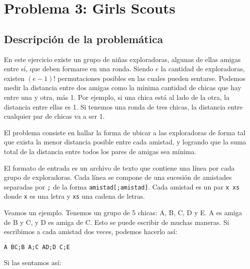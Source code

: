 \section{Problema 3: Girls Scouts}
\subsection{Descripción de la problemática}

En este ejercicio existe un grupo de niñas exploradoras, algunas de ellas amigas entre sí, que deben formarse en una ronda. Siendo $e$ la cantidad de exploradoras, existen $(e-1)!$ permutaciones posibles en las cuales pueden sentarse. Podemos medir la distancia entre dos amigas como la mínima cantidad de chicas que hay entre una y otra, más 1. Por ejemplo, si una chica está al lado de la otra, la distancia entre ellas es 1. Si tenemos una ronda de tres chicas, la distancia entre cualquier par de chicas va a ser 1.

El problema consiste en hallar la forma de ubicar a las exploradoras de forma tal que exista la menor distancia posible entre cada amistad, y logrando que la suma total de la distancia entre todos los pares de amigas sea mínima.

El formato de entrada es un archivo de texto que contiene una línea por cada grupo de exploradoras. Cada línea se compone de una sucesión de amistades separadas por \texttt{;} de la forma \texttt{amistad[;amistad]}. Cada amistad es un par \texttt{x xs} donde \texttt{x} es una letra y \texttt{xs} una cadena de letras.

Veamos un ejemplo. Tenemos un grupo de 5 chicas: A, B, C, D y E. A es amiga de B y C, y D es amiga de C. Esto se puede escribir de muchas maneras. Si escribimos a cada amistad dos veces, podemos hacerlo así:

\texttt{A BC;B A;C AD;D C;E}

Si las sentamos así:


